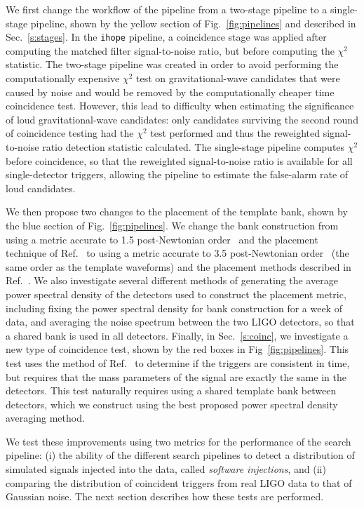 \documentclass[12pt]{iopart} \usepackage{graphicx,amssymb}
\begin{document}
We first change the workflow of the pipeline from a two-stage pipeline to a
single-stage pipeline, shown by the yellow section of Fig.~\ref{fig:pipelines} 
and described in Sec.~\ref{s:stages}. In the \texttt{ihope} pipeline, a coincidence stage
was applied after computing the matched filter signal-to-noise ratio, but
before computing the $\chi^2$ statistic. The two-stage pipeline was created in
order to avoid performing the computationally expensive $\chi^2$ test on
gravitational-wave candidates that were caused by noise and would be removed
by the computationally cheaper time coincidence test.  However, this lead to
difficulty when estimating the significance of loud gravitational-wave
candidates: only candidates surviving the second round of coincidence testing
had the $\chi^2$ test performed and thus the reweighted signal-to-noise ratio
detection statistic calculated. The single-stage pipeline computes $\chi^2$ 
before coincidence, so that the reweighted signal-to-noise ratio is 
available for all single-detector triggers, allowing the pipeline to estimate 
the false-alarm rate of loud candidates.

We then propose two changes to the placement of the
template bank, shown by the blue section of Fig.~\ref{fig:pipelines}. We
change the bank construction from using a metric accurate to 1.5
post-Newtonian order~\cite{Owen:1998dk} and the placement technique of
Ref.~\cite{Babak:2006ty} to using a metric accurate to 3.5 post-Newtonian
order~\cite{Keppel:2013kia} (the same order as the template waveforms) and the
placement methods described in Ref.~\cite{Brown:2012qf}. We also investigate
several different methods of generating the average power spectral density
of the detectors used to construct the placement metric, including fixing the
power spectral density for bank construction for a week of data, and
averaging the noise spectrum between the two LIGO detectors, so that a shared
bank is used in all detectors.  Finally, in Sec.~\ref{s:coinc}, we investigate a
new type of coincidence test, shown by the red boxes in
Fig~\ref{fig:pipelines}. This test uses the method of
Ref.~\cite{Robinson:2008un} to determine if the triggers are consistent in
time, but requires that the mass parameters of the signal are exactly the same
in the detectors. This test naturally requires using a shared template bank
between detectors, which we construct using the best proposed power spectral
density averaging method.

We test these improvements using two metrics for the performance of the search
pipeline: (i) the ability of the different search pipelines to detect a
distribution of simulated signals injected into the data, called
\emph{software injections}, and (ii) comparing the distribution of coincident
triggers from real LIGO data to that of Gaussian noise. The next
section describes how these tests are performed.
\end{document}
